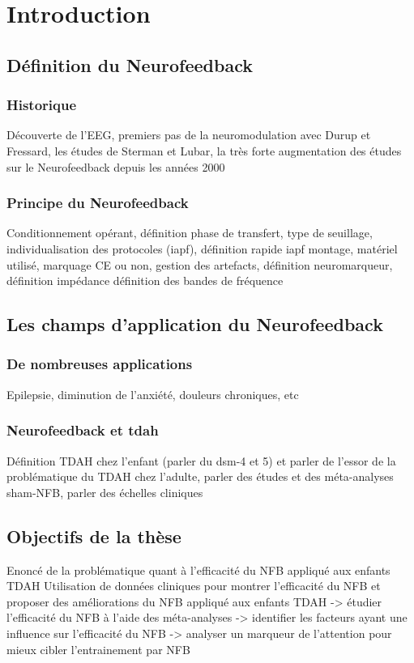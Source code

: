 \chapter{Introduction}


\section{Définition du Neurofeedback}

\subsection{Historique}
Découverte de l’EEG, premiers pas de la neuromodulation avec Durup 
et Fressard, les études de Sterman et Lubar, la très forte augmentation des études sur le Neurofeedback depuis 
les années 2000

\subsection{Principe du Neurofeedback}
Conditionnement opérant, définition phase de transfert, type de seuillage, individualisation des protocoles (iapf), 
définition rapide iapf
montage, matériel utilisé, marquage CE ou non, gestion des artefacts, définition neuromarqueur, définition impédance
définition des bandes de fréquence

\section{Les champs d'application du Neurofeedback}

\subsection{De nombreuses applications}
Epilepsie, diminution de l’anxiété, douleurs chroniques, etc

\subsection{Neurofeedback et \gls{tdah}}
Définition TDAH chez l’enfant (parler du dsm-4 et 5) et parler de l’essor de la problématique du TDAH chez l’adulte, parler des études et des méta-analyses
sham-NFB, parler des échelles cliniques

\section{Objectifs de la thèse}
Enoncé de la problématique quant à l’efficacité du NFB appliqué aux enfants TDAH
Utilisation de données cliniques pour montrer l'efficacité du NFB et proposer des améliorations du NFB appliqué aux enfants TDAH
-> étudier l'efficacité du NFB à l'aide des méta-analyses
-> identifier les facteurs ayant une influence sur l'efficacité du NFB
-> analyser un marqueur de l'attention pour mieux cibler l'entrainement par NFB

